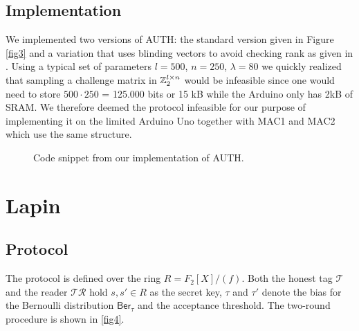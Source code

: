 \documentclass[11pt,a4paper]{article}
\begin{document}
\subsection{Implementation}

We implemented two versions of AUTH: the standard version given in Figure \ref{fig3} and a variation that uses blinding vectors to avoid checking rank as given in \cite{Kiltz2017}. 
Using a typical set of parameters $l=500$, $n=250$, $\lambda = 80$ we quickly realized that sampling a challenge matrix in $\mathbb{Z}_2^{l \times n}$ would be infeasible since one would need to store $500 \cdot 250$ = 125.000 bits or 15 kB while the Arduino only has 2kB of SRAM. We therefore deemed the protocol infeasible for our purpose of implementing it on the limited Arduino Uno together with MAC1 and MAC2 which use the same structure.

\begin{figure}[h]
	\caption{Code snippet from our implementation of AUTH. }
	\label{auth_code1}
\end{figure}

\newpage

\section{Lapin}

\subsection{Protocol}

The protocol is defined over the ring $R = F_2[X] / (f)$. Both the honest tag $\mathcal{T}$ and the reader $\mathcal{TR}$ hold $s, s' \in R$ as the secret key, $\tau$ and $\tau'$ denote the bias for the Bernoulli distribution $\mathsf{Ber}_\tau$ and the acceptance threshold. The two-round procedure is shown in \ref{fig4}.
\end{document}

